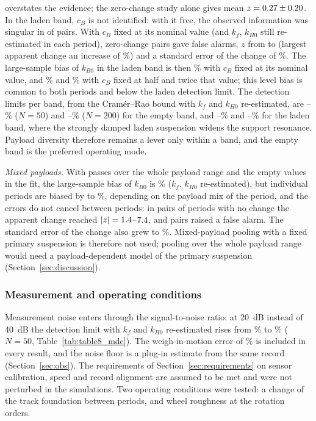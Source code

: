 overstates the evidence; the zero-change study alone gives mean $z = 0.27 \pm 0.20$. In the
laden band, $c_B$ is not
identified: with it free, the observed information was singular in \BandLadenNSingular{} of
\BandLadenPairsN{} pairs. With $c_B$ fixed at its nominal value (and $k_f$, $k_{H0}$ still re-estimated
in each period), \BandLadenFixPairsN{} zero-change pairs gave \BandLadenFixPairsFA{} false alarms, $z$
from \BandLadenFixZMin{} to \BandLadenFixZMax{} (largest apparent change an increase of
\BandLadenFixDMax\%) and a standard error of the change of \BandLadenFixSE\%. The large-sample bias of
$k_{B0}$ in the laden band is then \BandLadenFixPseudoOne\% with $c_B$ fixed at its nominal value, and
\BandLadenFixPseudoHalf\% and \BandLadenFixPseudoTwo\% with $c_B$ fixed at half and twice that value;
this level bias is common to both periods and below the laden detection limit. The detection limits per
band, from the Cram\'er--Rao bound with $k_f$ and $k_{H0}$ re-estimated, are
\BandEmptyMDCFiftyMin--\BandEmptyMDCFiftyMax\% ($N=50$) and
\BandEmptyMDCTwoHundredMin--\BandEmptyMDCTwoHundredMax\% ($N=200$) for the empty band, and
\BandLadenMDCFiftyMin--\BandLadenMDCFiftyMax\% and \BandLadenMDCTwoHundredMin--\BandLadenMDCTwoHundredMax\%
for the laden band, where the strongly damped laden suspension widens the support resonance. Payload
diversity therefore remains a lever only within a band, and the empty band is the preferred operating
mode.

\emph{Mixed payloads.} With passes over the whole payload range and the empty values in the fit, the
large-sample bias of $k_{B0}$ is \PDCoestBias\% ($k_f$, $k_{H0}$ re-estimated), but individual periods
are biased by \PDLevelMin{} to \PDLevelMax\%, depending on the payload mix of the period, and the
errors do not cancel between periods: in \PDPairsN{} pairs of periods with no change the apparent change
reached $|z| = 1.4$--$7.4$, and \PDPairsFA{} pairs raised a false alarm. The
standard error of the change also grew to \PDPairsSE\%. Mixed-payload pooling with a fixed primary
suspension is therefore not used; pooling over the whole payload range would need a payload-dependent
model of the primary suspension (Section~\ref{sec:discussion}).

\subsubsection{Measurement and operating conditions}\label{sec:res-budget-meas}
Measurement noise enters through the signal-to-noise ratio: at 20~dB instead of 40~dB the detection limit
with $k_f$ and $k_{H0}$ re-estimated rises from \MDCFiftyForty\% to \MDCFiftyTwenty\% ($N=50$,
Table~\ref{tab:table8_mdc}). The weigh-in-motion error of \WIMsigmaPct\% is included in every result, and
the noise floor is a plug-in estimate from the same record (Section~\ref{sec:obs}). The requirements of
Section~\ref{sec:requirements} on sensor calibration, speed and record alignment are assumed to be met and
were not perturbed in the simulations. Two operating conditions were tested: a change of the track
foundation between periods, and wheel roughness at the rotation orders.

